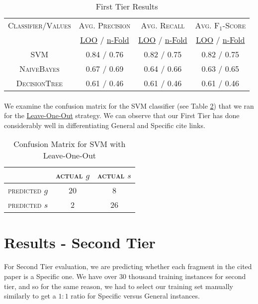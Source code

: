 \begin{table}[h]
	\center
	\begin{tabular}{ c | c  c  c }
		\textsc{Classifier/Values} & \textsc{Avg. Precision} & \textsc{Avg. Recall} & \textsc{Avg. F$_1$-Score} \\
		& \url{LOO} / \url{n-Fold} & \url{LOO} / \url{n-Fold} & \url{LOO} / \url{n-Fold} \\
		\hline
		\textsc{SVM} 			& 0.84 / 0.76 & 0.82 / 0.75 & 0.82 / 0.75 \\
		\textsc{NaiveBayes} 	& 0.67 / 0.69 & 0.64 / 0.66 & 0.63 / 0.65 \\
		\textsc{DecisionTree}	& 0.61 / 0.46 & 0.61 / 0.46 & 0.61 / 0.46
	\end{tabular}
	\caption{First Tier Results}
	\label{tab:firsttieresults}
\end{table}

\paragraph{}
We examine the confusion matrix for the SVM classifier (see Table \ref{tab:svmconfusionmatrix}) that we ran for the \url{Leave-One-Out} strategy. We can observe that our First Tier has done considerably well in differentiating General and Specific cite links.

\begin{table}[h]
	\center
	\begin{tabular}{ c | c  c }
		 & \textsc{actual $g$} & \textsc{actual $s$} \\
		\hline
		\textsc{predicted $g$} 	& 20 & 8 \\
		\textsc{predicted $s$}		& 2 & 26
	\end{tabular}
	\caption{Confusion Matrix for SVM with Leave-One-Out}
	\label{tab:svmconfusionmatrix}
\end{table}

\section{Results - Second Tier}
\paragraph{}
For Second Tier evaluation, we are predicting whether each fragment in the cited paper is a Specific one. We have over 30 thousand training instances for second tier, and so for the same reason, we had to select our training set manually similarly to get a $1:1$ ratio for Specific versus General instances.

